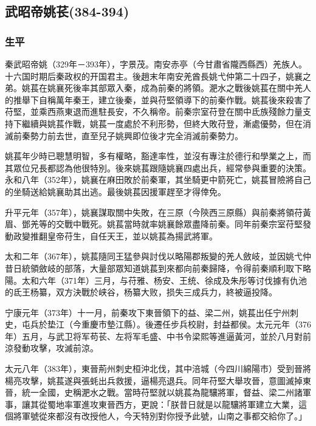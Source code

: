 
\subsection{武昭帝姚苌\tiny(384-394)}

\subsubsection{生平}

秦武昭帝姚（329年－393年），字景茂。南安赤亭（今甘肅省隴西縣西）羌族人。十六国时期后秦政权的开国君主。後趙末年南安羌酋長姚弋仲第二十四子，姚襄之弟。姚萇在姚襄死後率其部眾入秦，成為前秦的將領。淝水之戰後姚萇在關中羌人的推舉下自稱萬年秦王，建立後秦，並與苻堅領導下的前秦作戰。姚萇後來殺害了苻堅，並乘西燕東退而進駐長安，不久稱帝。前秦宗室苻登在關中氐族殘餘力量支持下繼續與姚萇作戰，姚萇一度處於不利形勢，但終大敗苻登，漸處優勢，但在消滅前秦勢力前去世，直至兒子姚興即位後才完全消滅前秦勢力。

姚萇年少時已聰慧明智，多有權略，豁達率性，並沒有專注於德行和學業之上，而其眾位兄長都認為他很特別。後來姚萇跟隨姚襄四處出兵，經常參與重要的決策。永和八年（352年），姚襄在麻田敗於前秦軍，其坐騎更中箭死亡，姚萇冒險將自己的坐騎送給姚襄助其出逃。最後姚萇因援軍趕至才得倖免。

升平元年（357年），姚襄謀取關中失敗，在三原（今陝西三原縣）與前秦將領苻黃眉、鄧羌等的交戰中戰死。姚萇當時就率姚襄餘眾盡降前秦。同年前秦宗室苻堅發動政變推翻皇帝苻生，自任天王，並以姚萇為揚武將軍。

太和二年（367年），姚萇隨同王猛參與討伐以略陽郡叛變的羌人斂岐，並因姚弋仲昔日統領斂岐的部落，大量部眾知道姚萇到來都向前秦歸降，令得前秦順利取下略陽。太和六年（371年）三月，与苻雅、杨安、王统、徐成及朱彤等讨伐據有仇池的氐王杨纂，双方決戰於峡谷，杨纂大败，损失三成兵力，終被逼投降。

宁康元年（373年）十一月，前秦攻下東晉領下的益、梁二州，姚萇出任宁州刺史，屯兵於垫江（今重慶市墊江縣）。後遷任步兵校尉，封益都侯。太元元年（376年）五月，与武卫将军苟苌、左将军毛盛、中书令梁熙等進逼黃河，並於八月對前涼發動攻擊，攻滅前涼。

太元八年（383年），東晉荊州刺史桓沖北伐，其中涪城（今四川綿陽市）受到晉將楊亮攻擊，姚萇遂與張蚝出兵救援，逼楊亮退兵。同年苻堅大舉攻晉，意圖滅掉東晉，統一全國，史稱淝水之戰。當時苻堅就以姚萇為龍驤將軍，督益、梁二州諸軍事，讓其從蜀地率軍進攻東晉西方，更說：「朕昔日就是以龍驤將軍建立大業，這個將軍號從來都沒有改授他人，今天特別對你授予此號，山南之事都交給你了。」

